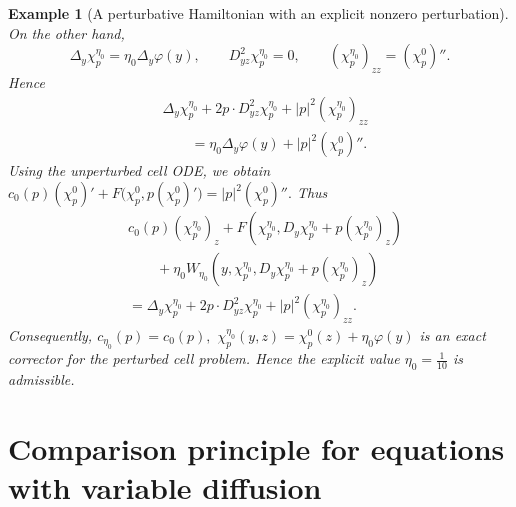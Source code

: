 \documentclass[preprint]{elsarticle}
\newtheorem{example}{Example}[section]
\numberwithin{equation}{section}
\begin{document}
\begin{example}[A perturbative Hamiltonian with an explicit nonzero perturbation]
On the other hand,
\begin{equation*}
\Delta_y\chi_p^{\eta_0}
=
\eta_0\Delta_y\varphi(y),
\qquad
D^2_{yz}\chi_p^{\eta_0}=0,
\qquad
(\chi_p^{\eta_0})_{zz}=(\chi_p^0)''.
\end{equation*}
Hence
\begin{equation*}
\begin{aligned}
&\Delta_y\chi_p^{\eta_0}
+
2p\cdot D^2_{yz}\chi_p^{\eta_0}
+
|p|^2(\chi_p^{\eta_0})_{zz}
\\
&\qquad
=
\eta_0\Delta_y\varphi(y)
+
|p|^2(\chi_p^0)''.
\end{aligned}
\end{equation*}
Using the unperturbed cell ODE, we obtain $c_0(p)(\chi_p^0)'
+
F\bigl(\chi_p^0,p(\chi_p^0)'\bigr)
=
|p|^2(\chi_p^0)''.$
Thus
\begin{equation*}
\begin{aligned}
&c_0(p)(\chi_p^{\eta_0})_z
+
F\left(
\chi_p^{\eta_0},
D_y\chi_p^{\eta_0}+p(\chi_p^{\eta_0})_z
\right)
\\
&\qquad
+
\eta_0W_{\eta_0}\left(
y,
\chi_p^{\eta_0},
D_y\chi_p^{\eta_0}+p(\chi_p^{\eta_0})_z
\right)
\\
&=
\Delta_y\chi_p^{\eta_0}
+
2p\cdot D^2_{yz}\chi_p^{\eta_0}
+
|p|^2(\chi_p^{\eta_0})_{zz}.
\end{aligned}
\end{equation*}
Consequently, $c_{\eta_0}(p)=c_0(p),
$ $
\chi_p^{\eta_0}(y,z)=\chi_p^0(z)+\eta_0\varphi(y)$
is an exact corrector for the perturbed cell problem. Hence the explicit value $\eta_0=\frac{1}{10}$
is admissible.
\end{example}

\appendix
\renewcommand{\theproposition}{\Alph{section}.\arabic{proposition}}
\renewcommand{\thelemma}{\Alph{section}.\arabic{lemma}}

\section{Comparison principle for equations with variable diffusion}
\end{document}
